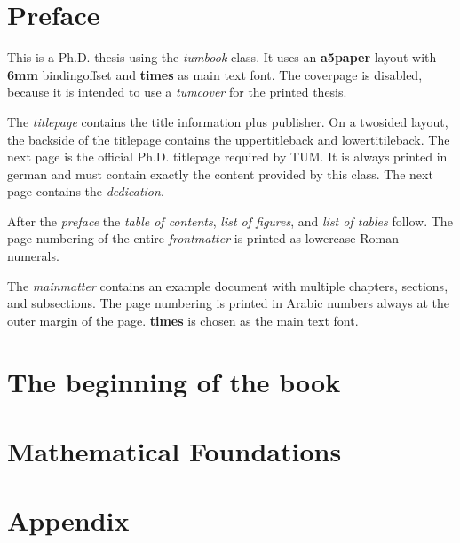 \documentclass[a5paper,thesis=phd,coverpage=false,BCOR=6mm,
  font=times,headmarks]{tumbook}
\begin{document}
\frontmatter
\maketitle

\chapter{Preface}
 {\color{TUMOrange}This is a Ph.D. thesis using the \emph{tumbook} class.
  It uses an \textbf{a5paper} layout with \textbf{6mm} bindingoffset and
  \textbf{times} as main text font. The coverpage is disabled, because
  it is intended to use a \emph{tumcover} for the printed thesis.\par
  The \emph{titlepage} contains the title information plus publisher.
  On a twosided layout, the backside of the titlepage contains
  the uppertitleback and lowertitileback.
  The next page is the official Ph.D. titlepage required by TUM. It is always
  printed in german and must contain exactly the content provided by this
  class. The next page contains the \emph{dedication}.\par
  After the \emph{preface} the \emph{table of contents},
  \emph{list of figures}, and \emph{list of tables} follow.
  The page numbering of the entire \emph{frontmatter} is printed as
  lowercase Roman numerals.\par
  The \emph{mainmatter} contains an example document with multiple chapters,
  sections, and subsections. The page numbering is printed in Arabic numbers
  always at the outer margin of the page. \textbf{times} is chosen as the
  main text font.
 }

\lipsum[1-4]
\cleardoublepage

\tableofcontents
\listoffigures
\listoftables

\mainmatter
\chapter{The beginning of the book}


\chapter{Mathematical Foundations}


\appendix
\chapter{Appendix}


\backmatter


\end{document}
